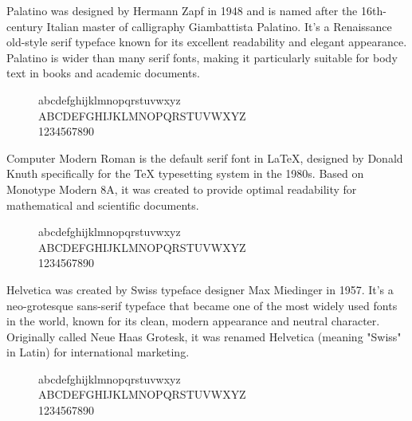   \begin{example}[Palatino]
    Palatino was designed by Hermann Zapf in 1948 and is named after the 16th-century Italian master of calligraphy Giambattista Palatino. It's a Renaissance old-style serif typeface known for its excellent readability and elegant appearance. Palatino is wider than many serif fonts, making it particularly suitable for body text in books and academic documents. 
    
    \begin{figure}[H]
      \selectfont
      \huge
      \raggedright
      abcdefghijklmnopqrstuvwxyz \\
      ABCDEFGHIJKLMNOPQRSTUVWXYZ \\
      1234567890
    \end{figure}
  \end{example}

  \begin{example}
    Computer Modern Roman is the default serif font in LaTeX, designed by Donald Knuth specifically for the TeX typesetting system in the 1980s. Based on Monotype Modern 8A, it was created to provide optimal readability for mathematical and scientific documents. 
    
    \begin{figure}[H]
      \huge
      \raggedright
      abcdefghijklmnopqrstuvwxyz \\
      ABCDEFGHIJKLMNOPQRSTUVWXYZ \\
      1234567890
    \end{figure}
  \end{example}

  \begin{example}[Helvetica]
    Helvetica was created by Swiss typeface designer Max Miedinger in 1957. It's a neo-grotesque sans-serif typeface that became one of the most widely used fonts in the world, known for its clean, modern appearance and neutral character. Originally called Neue Haas Grotesk, it was renamed Helvetica (meaning "Swiss" in Latin) for international marketing. 
    
    \begin{figure}[H]
      \selectfont 
      \huge
      \raggedright
      abcdefghijklmnopqrstuvwxyz \\
      ABCDEFGHIJKLMNOPQRSTUVWXYZ \\
      1234567890
    \end{figure}
  \end{example}

